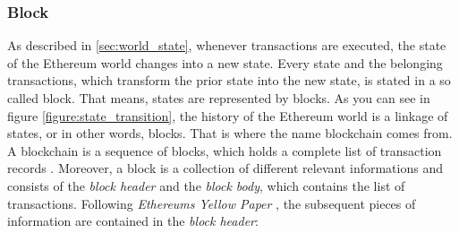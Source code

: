 \subsubsection{Block} 
As described in \ref{sec:world_state}, whenever transactions are executed, the state of the Ethereum world changes into a new state. Every state and the belonging transactions, which transform the prior state into the new state, is stated in a so called block. That means, states are represented by blocks. As you can see in figure \ref{figure:state_transition}, the history of the Ethereum world is a linkage of states, or in other words, blocks. That is where the name blockchain comes from. A blockchain is a sequence of blocks, which holds a complete list of transaction records . 
Moreover, a block is a collection of different relevant informations and consists of the \textit{block header} and the \textit{block body}, which contains the list of transactions. Following \textit{Ethereums Yellow Paper} , the subsequent pieces of information are contained in the \textit{block header}:

